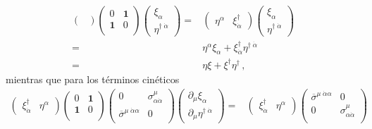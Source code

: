 \begin{frame}
\begin{align}
\begin{pmatrix}
  \end{pmatrix}
  \begin{pmatrix}
    0           &\boldsymbol{1}\\
    \boldsymbol{1} &0\\
  \end{pmatrix} \begin{pmatrix}
   \xi_{\alpha}\\
   \eta^{\dagger\;\dot{\alpha}}    
  \end{pmatrix}
=&
\begin{pmatrix}
  \eta^{\alpha} & \xi^{\dagger}_{\dot{\alpha}}
\end{pmatrix}
\begin{pmatrix}
   \xi_{\alpha}\\
   \eta^{\dagger\;\dot{\alpha}}    
  \end{pmatrix}
\nonumber\\
=&\eta^{\alpha}\xi_{\alpha} +\xi^{\dagger}_{\dot{\alpha}}\eta^{\dagger\;\dot{\alpha}}\nonumber\\
=&\eta\xi+\xi^{\dagger}\eta^{\dagger}\,,
\end{align}
mientras que para los términos cinéticos
\begin{align}
\label{eq:psidd}
  \begin{pmatrix}
  \xi^{\dagger}_{\dot{\alpha}}& \eta^{\alpha}
  \end{pmatrix}
 \begin{pmatrix}
    0           &\boldsymbol{1}\\
    \boldsymbol{1} &0\\
  \end{pmatrix}
  \begin{pmatrix}
    0           &\sigma^{\mu}_{\alpha\dot{\alpha}}\\
    \overline{\sigma}^{\mu\;\dot{\alpha}\alpha} &0\\
  \end{pmatrix} \begin{pmatrix}
   \partial_{\mu}\xi_{\alpha}\\
   \partial_{\mu}\eta^{\dagger\;\dot{\alpha}}    
  \end{pmatrix}
=&
 \begin{pmatrix}
  \xi^{\dagger}_{\dot{\alpha}}& \eta^{\alpha}
  \end{pmatrix}
  \begin{pmatrix}
    \overline{\sigma}^{\mu\;\dot{\alpha}\alpha}&0\\
     0                    &\sigma^{\mu}_{\alpha\dot{\alpha}}\\

\end{pmatrix}
\end{align}
\end{frame}
